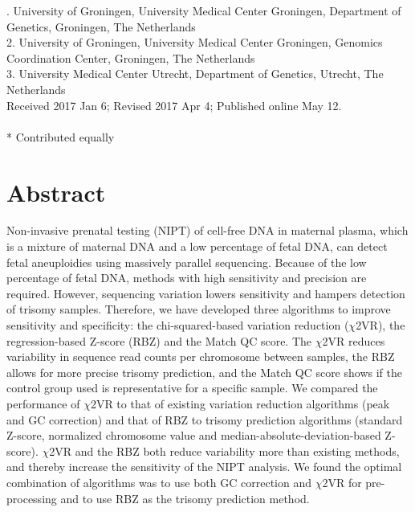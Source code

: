 . University of Groningen, University Medical Center Groningen, Department of Genetics, Groningen, The Netherlands\\
2. University of Groningen, University Medical Center Groningen, Genomics Coordination Center, Groningen, The Netherlands\\
3. University Medical Center Utrecht, Department of Genetics, Utrecht, The Netherlands\\


\noindent
Received 2017 Jan 6; Revised 2017 Apr 4; Published online May 12.
\\~\\
* Contributed equally



\section*{Abstract}\label{abstract}
Non-invasive prenatal testing (NIPT) of cell-free DNA in maternal plasma, which is a mixture of maternal DNA and a low percentage of fetal DNA, can detect fetal aneuploidies using massively parallel sequencing. 
Because of the low percentage of fetal DNA, methods with high sensitivity and precision are required. 
However, sequencing variation lowers sensitivity and hampers detection of trisomy samples. 
Therefore, we have developed three algorithms to improve sensitivity and specificity: the chi-squared-based variation reduction ($\chi$2VR), the regression-based Z-score (RBZ) and the Match QC score. 
The $\chi$2VR reduces variability in sequence read counts per chromosome between samples, the RBZ allows for more precise trisomy prediction, and the Match QC score shows if the control group used is representative for a specific sample. We compared the performance of $\chi$2VR to that of existing variation reduction algorithms (peak and GC correction) and that of RBZ to trisomy prediction algorithms (standard Z-score, normalized chromosome value and median-absolute-deviation-based Z-score). 
$\chi$2VR and the RBZ both reduce variability more than existing methods, and thereby increase the sensitivity of the NIPT analysis. 
We found the optimal combination of algorithms was to use both GC correction and $\chi$2VR for pre-processing and to use RBZ as the trisomy prediction method.

